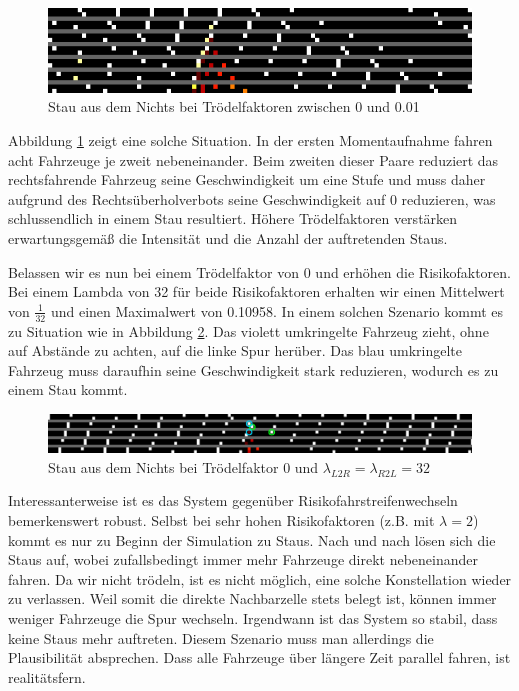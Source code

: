 \documentclass[10pt, a4paper]{article}
\begin{document}
\begin{figure}[h!]
	\centering
	\includegraphics[width=\textwidth]{img/erg_mehrspurig_stau_aus_dem_nichts_p_0_01}
	\caption{Stau aus dem Nichts bei Trödelfaktoren zwischen 0 und 0.01}
	\label{fig:ergStauAusDemNichtsMehrspurigP0_01}
\end{figure}

Abbildung \ref{fig:ergStauAusDemNichtsMehrspurigP0_01} zeigt eine solche Situation. In der ersten Momentaufnahme fahren acht Fahrzeuge je zweit nebeneinander. Beim zweiten dieser Paare reduziert das rechtsfahrende Fahrzeug seine Geschwindigkeit um eine Stufe und muss daher aufgrund des Rechtsüberholverbots seine Geschwindigkeit auf 0 reduzieren, was schlussendlich in einem Stau resultiert. Höhere Trödelfaktoren verstärken erwartungsgemäß die Intensität und die Anzahl der auftretenden Staus.

Belassen wir es nun bei einem Trödelfaktor von 0 und erhöhen die Risikofaktoren. Bei einem Lambda von 32 für beide Risikofaktoren erhalten wir einen Mittelwert von $\frac{1}{32}$ und einen Maximalwert von 0.10958. In einem solchen Szenario kommt es zu Situation wie in Abbildung \ref{fig:ergStauAusDemNichtsMehrspurig_p_0_r_32}. Das violett umkringelte Fahrzeug zieht, ohne auf Abstände zu achten, auf die linke Spur herüber. Das blau umkringelte Fahrzeug muss daraufhin seine Geschwindigkeit stark reduzieren, wodurch es zu einem Stau kommt.

\begin{figure}[h!]
	\centering
	\includegraphics[width=\textwidth]{img/erg_mehrspurig_stau_wegen_risikospurwechsel_p_0_r_32_version2}
	\caption{Stau aus dem Nichts bei Trödelfaktor 0 und $\lambda_{L2R} = \lambda_{R2L} = 32$}
	\label{fig:ergStauAusDemNichtsMehrspurig_p_0_r_32}
\end{figure}

Interessanterweise ist es das System gegenüber Risikofahrstreifenwechseln bemerkenswert robust. Selbst bei sehr hohen Risikofaktoren (z.B. mit $\lambda = 2$) kommt es nur zu Beginn der Simulation zu Staus. Nach und nach lösen sich die Staus auf, wobei zufallsbedingt immer mehr Fahrzeuge direkt nebeneinander fahren. Da wir nicht trödeln, ist es nicht möglich, eine solche Konstellation wieder zu verlassen. Weil somit die direkte Nachbarzelle stets belegt ist, können immer weniger Fahrzeuge die Spur wechseln. Irgendwann ist das System so stabil, dass keine Staus mehr auftreten. Diesem Szenario muss man allerdings die Plausibilität absprechen. Dass alle Fahrzeuge über längere Zeit parallel fahren, ist realitätsfern.
\end{document}
